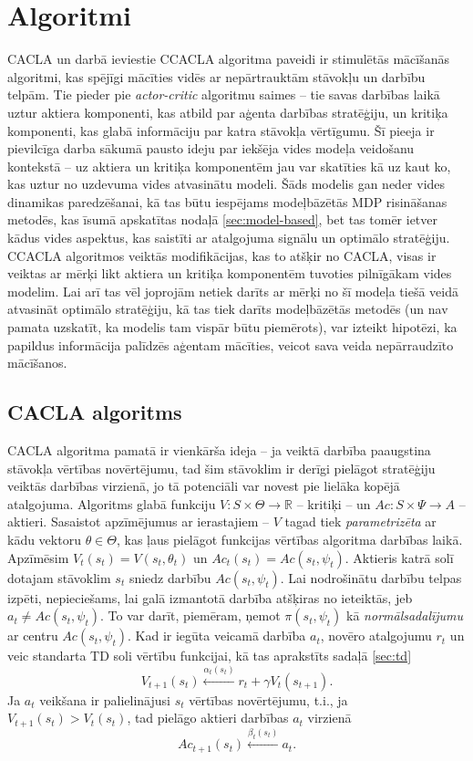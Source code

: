 \documentclass{ludis} %
\begin{document}
\chapter{Algoritmi}\label{chap:algo}
CACLA un darbā ieviestie CCACLA algoritma paveidi ir stimulētās mācīšanās
algoritmi, kas spējīgi mācīties vidēs ar nepārtrauktām stāvokļu un darbību
telpām. Tie pieder pie \textit{actor-critic} algoritmu saimes -- tie savas
darbības laikā uztur aktiera komponenti, kas atbild par aģenta darbības
stratēģiju, un kritiķa komponenti, kas glabā informāciju par katra stāvokļa
vērtīgumu. Šī pieeja ir pievilcīga darba sākumā pausto ideju par iekšēja vides
modeļa veidošanu kontekstā -- uz aktiera un kritiķa komponentēm jau var
skatīties kā uz kaut ko, kas uztur no uzdevuma vides atvasinātu modeli. Šāds
modelis gan neder vides dinamikas paredzēšanai, kā tas būtu iespējams
modeļbāzētās MDP risināšanas metodēs, kas īsumā apskatītas nodaļā
\ref{sec:model-based}, bet tas tomēr ietver kādus vides aspektus, kas saistīti
ar atalgojuma signālu un optimālo stratēģiju. CCACLA algoritmos veiktās
modifikācijas, kas to atšķir no CACLA, visas ir veiktas ar mērķi likt aktiera un
kritiķa komponentēm tuvoties pilnīgākam vides modelim. Lai arī tas vēl joprojām
netiek darīts ar mērķi no šī modeļa tiešā veidā atvasināt optimālo stratēģiju,
kā tas tiek darīts modeļbāzētās metodēs (un nav pamata uzskatīt, ka modelis tam
vispār būtu piemērots), var izteikt hipotēzi, ka papildus informācija palīdzēs
aģentam mācīties, veicot sava veida nepārraudzīto mācīšanos.

\section{CACLA algoritms}
CACLA algoritma pamatā ir vienkārša ideja -- ja veiktā darbība paaugstina
stāvokļa vērtības novērtējumu, tad šim stāvoklim ir derīgi pielāgot stratēģiju
veiktās darbības virzienā, jo tā potenciāli var novest pie lielāka kopējā
atalgojuma.
Algoritms glabā funkciju $V:S \times \Theta \rightarrow \mathbb{R}$ -- kritiķi
-- un $Ac : S \times \Psi \rightarrow A$ -- aktieri. Sasaistot apzīmējumus ar
ierastajiem -- $V$ tagad tiek \textit{parametrizēta} ar kādu vektoru $\theta \in
\Theta$, kas ļaus pielāgot funkcijas vērtības algoritma darbības laikā.
Apzīmēsim $V_t(s_t) = V(s_t, \theta_t)$ un $Ac_t(s_t) = Ac(s_t, \psi_t)$.
Aktieris katrā solī dotajam stāvoklim $s_t$ sniedz darbību $Ac(s_t, \psi_t)$.
Lai nodrošinātu darbību telpas izpēti, nepieciešams, lai galā izmantotā darbība
atšķiras no ieteiktās, jeb $a_t \neq Ac(s_t, \psi_t)$. To var darīt, piemēram,
ņemot $\pi(s_t, \psi_t)$ kā \textit{normālsadalījumu} ar centru $Ac(s_t,
\psi_t)$. Kad ir iegūta veicamā darbība $a_t$, novēro atalgojumu $r_t$ un veic
standarta TD soli vērtību funkcijai, kā tas aprakstīts sadaļā \ref{sec:td}
\[
	V_{t+1}(s_t) \xleftarrow{\alpha_t(s_t)} r_t + \gamma V_t(s_{t + 1}).
\]
Ja $a_t$ veikšana ir palielinājusi $s_t$ vērtības novērtējumu, t.i., ja
$V_{t+1}(s_t) > V_t(s_t)$, tad pielāgo aktieri darbības $a_t$ virzienā
\[
	Ac_{t+1}(s_t) \xleftarrow{\beta_t(s_t)} a_t.
\]
\end{document}
